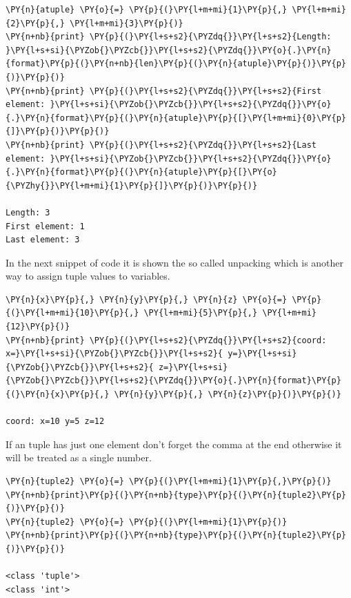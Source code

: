 \begin{codebox}[breakable, size=fbox, boxrule=1pt, pad at break*=1mm, colback=cellbackground, colframe=cellborder]
\begin{Verbatim}[commandchars=\\\{\}]
\PY{n}{atuple} \PY{o}{=} \PY{p}{(}\PY{l+m+mi}{1}\PY{p}{,} \PY{l+m+mi}{2}\PY{p}{,} \PY{l+m+mi}{3}\PY{p}{)}
\PY{n+nb}{print} \PY{p}{(}\PY{l+s+s2}{\PYZdq{}}\PY{l+s+s2}{Length: }\PY{l+s+si}{\PYZob{}\PYZcb{}}\PY{l+s+s2}{\PYZdq{}}\PY{o}{.}\PY{n}{format}\PY{p}{(}\PY{n+nb}{len}\PY{p}{(}\PY{n}{atuple}\PY{p}{)}\PY{p}{)}\PY{p}{)}
\PY{n+nb}{print} \PY{p}{(}\PY{l+s+s2}{\PYZdq{}}\PY{l+s+s2}{First element: }\PY{l+s+si}{\PYZob{}\PYZcb{}}\PY{l+s+s2}{\PYZdq{}}\PY{o}{.}\PY{n}{format}\PY{p}{(}\PY{n}{atuple}\PY{p}{[}\PY{l+m+mi}{0}\PY{p}{]}\PY{p}{)}\PY{p}{)}
\PY{n+nb}{print} \PY{p}{(}\PY{l+s+s2}{\PYZdq{}}\PY{l+s+s2}{Last element: }\PY{l+s+si}{\PYZob{}\PYZcb{}}\PY{l+s+s2}{\PYZdq{}}\PY{o}{.}\PY{n}{format}\PY{p}{(}\PY{n}{atuple}\PY{p}{[}\PY{o}{\PYZhy{}}\PY{l+m+mi}{1}\PY{p}{]}\PY{p}{)}\PY{p}{)}

Length: 3
First element: 1
Last element: 3
\end{Verbatim}
\end{codebox}

In the next snippet of code it is shown the so called unpacking which is another way to assign tuple values to variables.

\begin{codebox}[breakable, size=fbox, boxrule=1pt, pad at break*=1mm, colback=cellbackground, colframe=cellborder]
\begin{Verbatim}[commandchars=\\\{\}]
\PY{n}{x}\PY{p}{,} \PY{n}{y}\PY{p}{,} \PY{n}{z} \PY{o}{=} \PY{p}{(}\PY{l+m+mi}{10}\PY{p}{,} \PY{l+m+mi}{5}\PY{p}{,} \PY{l+m+mi}{12}\PY{p}{)}
\PY{n+nb}{print} \PY{p}{(}\PY{l+s+s2}{\PYZdq{}}\PY{l+s+s2}{coord: x=}\PY{l+s+si}{\PYZob{}\PYZcb{}}\PY{l+s+s2}{ y=}\PY{l+s+si}{\PYZob{}\PYZcb{}}\PY{l+s+s2}{ z=}\PY{l+s+si}{\PYZob{}\PYZcb{}}\PY{l+s+s2}{\PYZdq{}}\PY{o}{.}\PY{n}{format}\PY{p}{(}\PY{n}{x}\PY{p}{,} \PY{n}{y}\PY{p}{,} \PY{n}{z}\PY{p}{)}\PY{p}{)}

coord: x=10 y=5 z=12
\end{Verbatim}
\end{codebox}

If an tuple has just one element don't forget the comma at the end otherwise it will be 
treated as a single number.

\begin{codebox}[breakable, size=fbox, boxrule=1pt, pad at break*=1mm, colback=cellbackground, colframe=cellborder]
\begin{Verbatim}[commandchars=\\\{\}]
\PY{n}{tuple2} \PY{o}{=} \PY{p}{(}\PY{l+m+mi}{1}\PY{p}{,}\PY{p}{)}
\PY{n+nb}{print}\PY{p}{(}\PY{n+nb}{type}\PY{p}{(}\PY{n}{tuple2}\PY{p}{)}\PY{p}{)}
\PY{n}{tuple2} \PY{o}{=} \PY{p}{(}\PY{l+m+mi}{1}\PY{p}{)}
\PY{n+nb}{print}\PY{p}{(}\PY{n+nb}{type}\PY{p}{(}\PY{n}{tuple2}\PY{p}{)}\PY{p}{)}

<class 'tuple'>
<class 'int'>
\end{Verbatim}
\end{codebox}

